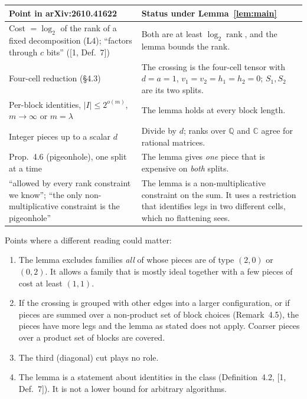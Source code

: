 \documentclass[11pt]{article}
\theoremstyle{remark}
\newcommand{\rk}{\operatorname{rank}}
\begin{document}
\begin{center}\small
\begin{tabularx}{\textwidth}{>{\raggedright\arraybackslash}p{}X}
\toprule
Point in arXiv:2610.41622 & Status under Lemma~\ref{lem:main}\\
\midrule
Cost $=\log_2$ of the rank of a fixed decomposition (L4); ``factors through $c$ bits'' ([1, Def.~7]) & Both are at least $\log_2\rk$, and the lemma bounds the rank.\\
Four-cell reduction (\S4.3) & The crossing is the four-cell tensor with $d=a=1$, $v_1=v_2=h_1=h_2=0$; $S_1,S_2$ are its two splits.\\
Per-block identities, $|I|\le 2^{o(m)}$, $m\to\infty$ or $m=\lambda$ & The lemma holds at every block length.\\
Integer pieces up to a scalar $d$ & Divide by $d$; ranks over $\mathbb{Q}$ and $\mathbb{C}$ agree for rational matrices.\\
Prop.~4.6 (pigeonhole), one split at a time & The lemma gives \emph{one} piece that is expensive on \emph{both} splits.\\
``allowed by every rank constraint we know''; ``the only non-multiplicative constraint is the pigeonhole'' & The lemma is a non-multiplicative constraint on the sum. It uses a restriction that identifies legs in two different cells, which no flattening sees.\\
\bottomrule
\end{tabularx}
\end{center}

Points where a different reading could matter:
\begin{enumerate}
\item The lemma excludes families \emph{all} of whose pieces are of type $(2,0)$ or $(0,2)$. It allows a family that is mostly ideal together with a few pieces of cost at least $(1,1)$.
\item If the crossing is grouped with other edges into a larger configuration, or if pieces are summed over a non-product set of block choices (Remark~4.5), the pieces have more legs and the lemma as stated does not apply. Coarser pieces over a product set of blocks are covered.
\item The third (diagonal) cut plays no role.
\item The lemma is a statement about identities in the class (Definition~4.2, [1, Def.~7]). It is not a lower bound for arbitrary algorithms.
\end{enumerate}
\end{document}
